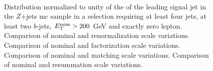\begin{figure}[h!]
\centering 
{}
\\
\caption{Distribution normalized to unity of the \pt of the leading signal jet in the $Z$+jets \gls{mc} sample in a selection requiring at least four jets, at least two $b$-jets, $E_{\rm T}^{\mathrm{miss}}>200$ GeV and exactly zero lepton. 
 Comparison of nominal and renormalization scale variations.
 Comparison of nominal and factorization scale variations.
 Comparison of nominal and matching scale variations.
 Comparison of nominal and resummation scale variations.
}\label{fig:W_met_0L_syst}
\end{figure}


